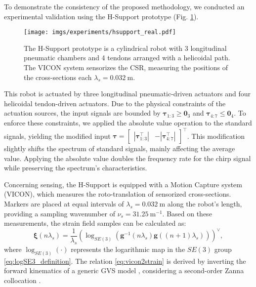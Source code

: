 To demonstrate the consistency of the proposed methodology, we conducted an experimental validation using the H-Support prototype (Fig. \ref{fig:h_support_prototype}).
%     
\begin{figure}
    \centering
    \texttt{[image: imgs/experiments/hsupport\_real.pdf]}
    \caption{The H-Support prototype is a cylindrical robot with 3 longitudinal pneumatic chambers and 4 tendons arranged with a helicoidal path. The VICON system sensorizes the \ac{CSR}, measuring the positions of the cross-sections each $\lambda_s = \SI{0.032}{\meter}$.}
    \label{fig:h_support_prototype}
\end{figure}
This robot is actuated by three longitudinal pneumatic-driven actuators and four helicoidal tendon-driven actuators. Due to the physical constraints of the actuation sources, the input signals are bounded by \(\bm{\tau}_{1:3} \geq \bm{0}_3\) and \(\bm{\tau}_{4:7} \leq \bm{0}_4\). 
To enforce these constraints, we applied the absolute value operation to the standard signals, yielding the modified input 
$\bm{\tau} = \begin{bmatrix} |\bm{\tau}_{1:3}^{\top}| &  -|\bm{\tau}_{4:7}^{\top}|\end{bmatrix}^{\top}$.
This modification slightly shifts the spectrum of standard signals, mainly affecting the average value. Applying the absolute value doubles the frequency rate for the chirp signal while preserving the spectrum's characteristics.

Concerning sensing, the H-Support is equipped with a Motion Capture system (VICON), which measures the roto-translation of sensorized cross-sections. 
Markers are placed at equal intervals of $\lambda_s = \SI{0.032}{\meter}$ along the robot's length, providing a sampling wavenumber of $\nu_s = \SI{31.25}{\meter^{-1}}$. Based on these measurements, the strain field samples can be calculated as:  
\begin{equation} \label{eq:vicon2strain}
    \bm{\xi}(n \lambda_s) = \frac{1}{\lambda_s}
    \left(\log_{SE(3)}\left(\bm{g}^{-1}\left(n \lambda_s\right) \bm{g}\left((n + 1) \lambda_s\right)\right)\right)^{\vee} ,
\end{equation}
where $\log_{SE(3)}(\cdot)$ represents the logarithmic map in the $SE(3)$ group \eqref{eq:logSE3_definition}. 
The relation \eqref{eq:vicon2strain} is derived by inverting the forward kinematics of a generic \ac{GVS} model \cite{mathew2024reduced}, considering a second-order Zanna collocation \cite{zanna1999collocation}.

